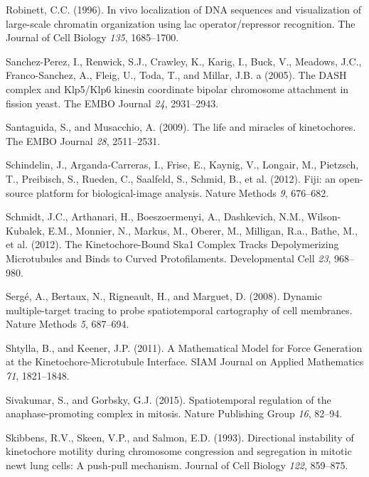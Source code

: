 \documentclass[12pt,a4paper,twoside,openright]{book}
\begin{document}
\hypertarget{ref-Robinett1996}{}
Robinett, C.C. (1996). In vivo localization of DNA sequences and
visualization of large-scale chromatin organization using lac
operator/repressor recognition. The Journal of Cell Biology \emph{135},
1685--1700.

\hypertarget{ref-Sanchez-Perez2005}{}
Sanchez-Perez, I., Renwick, S.J., Crawley, K., Karig, I., Buck, V.,
Meadows, J.C., Franco-Sanchez, A., Fleig, U., Toda, T., and Millar, J.B.
a (2005). The DASH complex and Klp5/Klp6 kinesin coordinate bipolar
chromosome attachment in fission yeast. The EMBO Journal \emph{24},
2931--2943.

\hypertarget{ref-Santaguida2009a}{}
Santaguida, S., and Musacchio, A. (2009). The life and miracles of
kinetochores. The EMBO Journal \emph{28}, 2511--2531.

\hypertarget{ref-Schindelin2012}{}
Schindelin, J., Arganda-Carreras, I., Frise, E., Kaynig, V., Longair,
M., Pietzsch, T., Preibisch, S., Rueden, C., Saalfeld, S., Schmid, B.,
et al. (2012). Fiji: an open-source platform for biological-image
analysis. Nature Methods \emph{9}, 676--682.

\hypertarget{ref-Schmidt2012}{}
Schmidt, J.C., Arthanari, H., Boeszoermenyi, A., Dashkevich, N.M.,
Wilson-Kubalek, E.M., Monnier, N., Markus, M., Oberer, M., Milligan,
R.a., Bathe, M., et al. (2012). The Kinetochore-Bound Ska1 Complex
Tracks Depolymerizing Microtubules and Binds to Curved Protofilaments.
Developmental Cell \emph{23}, 968--980.

\hypertarget{ref-Serge2008}{}
Sergé, A., Bertaux, N., Rigneault, H., and Marguet, D. (2008). Dynamic
multiple-target tracing to probe spatiotemporal cartography of cell
membranes. Nature Methods \emph{5}, 687--694.

\hypertarget{ref-Shtylla2011}{}
Shtylla, B., and Keener, J.P. (2011). A Mathematical Model for Force
Generation at the Kinetochore-Microtubule Interface. SIAM Journal on
Applied Mathematics \emph{71}, 1821--1848.

\hypertarget{ref-Sivakumar2015}{}
Sivakumar, S., and Gorbsky, G.J. (2015). Spatiotemporal regulation of
the anaphase-promoting complex in mitosis. Nature Publishing Group
\emph{16}, 82--94.

\hypertarget{ref-Skibbens1993}{}
Skibbens, R.V., Skeen, V.P., and Salmon, E.D. (1993). Directional
instability of kinetochore motility during chromosome congression and
segregation in mitotic newt lung cells: A push-pull mechanism. Journal
of Cell Biology \emph{122}, 859--875.
\end{document}
